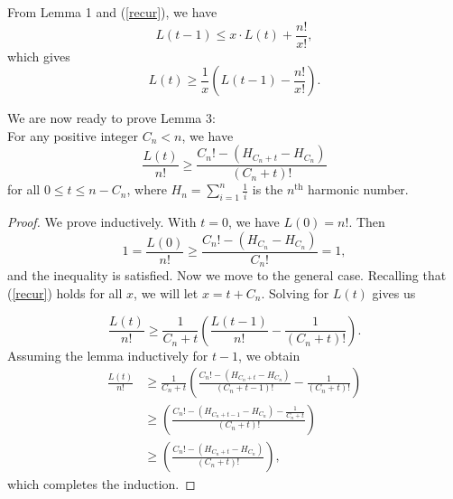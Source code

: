 \documentclass[12pt, a4paper]{article}
\newcommand{\nth}{^{\text{th}}}       %
\begin{document}
		
		From Lemma 1 and (\ref{recur}), we have
		\begin{equation*}
			L(t-1) \le x\cdot L(t) + \frac{n!}{x!},
		\end{equation*}
		which gives
		\begin{equation*}
			L(t)\ge \frac{1}{x}\left(L(t-1)-\frac{n!}{x!}\right).
		\end{equation*}
		
		We are now ready to prove Lemma 3: \\
		For any positive integer $C_n < n$, we have
			\begin{equation*}
				\frac{L(t)}{n!}\ge \frac{C_{n}! - (H_{C_{n}+t} - H_{C_{n}})}{(C_n+t)!}
			\end{equation*}
			for all $0\le t\le n-C_{n}$, where $H_n=\sum_{i = 1}^n\frac{1}{i}$ is the $n\nth$ harmonic number.
		\begin{proof} We prove inductively. With $t=0$, we have $L(0) = n!$. Then
			\begin{equation*}
			1 =\frac{L(0)}{n!}\ge \frac{C_{n}! - (H_{C_{n}}-H_{C_{n}})}{C_{n}!} = 1,
			\end{equation*}
			and the inequality is satisfied. Now we move to the general case.
			Recalling that (\ref{recur}) holds for all $x$, we will
		let $x=t+C_{n}$. Solving for $L(t)$ gives us
		
			\begin{equation*}
			\frac{L(t)}{n!}
			 \ge \frac{1}{C_{n}+t}\left(\frac{L(t-1)}{n!}
			-\frac{1}{(C_{n}+t)!}\right).
			\end{equation*}
		Assuming the lemma inductively for $t-1$, we obtain
			\begin{align*}
			\frac{L(t)}{n!}
			& \ge \frac{1}{C_{n}+t}\left(\frac{C_{n}!-(H_{C_{n}+t} - H_{C_{n}})}
			{(C_{n}+t-1)!} - \frac{1}{(C_{n}+t)!}\right)\\
			& \ge \left(\frac{C_{n}! - (H_{C_{n}+t-1} - H_{C_{n}}) - \frac{1}{C_{n}+t}}
			{(C_{n}+t)!}\right)\\
			& \ge \left(\frac{C_{n}! - (H_{C_{n}+t} - H_{C_{n}})}{(C_{n}+t)!}\right),
			\end{align*}
			which completes the induction.
		\end{proof}

	
\end{document}
